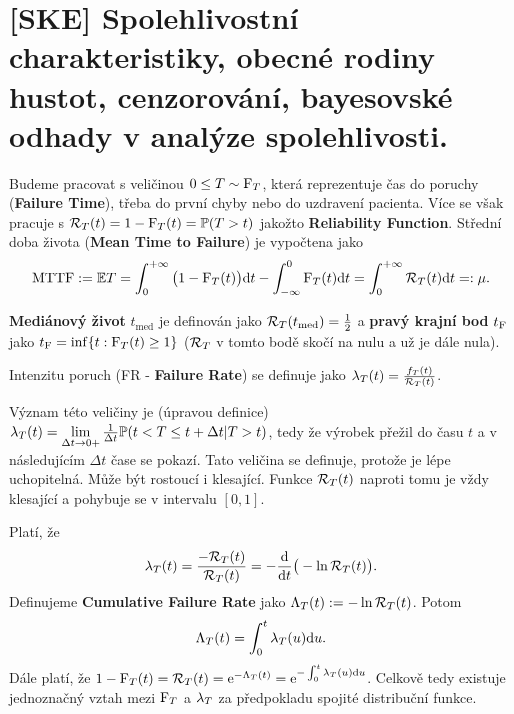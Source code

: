 \chapter{[SKE] Spolehlivostní charakteristiky, obecné rodiny hustot, cenzorování, bayesovské odhady v analýze spolehlivosti.}

Budeme pracovat s veličinou  $0\leq T\sim \mathrm{F}_T$, která reprezentuje čas do poruchy (\textbf{Failure Time}), třeba do první chyby nebo do uzdravení pacienta. Více se však pracuje s $\mathcal{R}_T(t)=1-\mathrm{F}_T(t)=\mathbb{P}(T>t)$ jakožto \textbf{Reliability Function}. Střední doba života (\textbf{Mean Time to Failure}) je vypočtena jako $$\mathrm{MTTF}:=\mathbb{E} T=\int_{0}^{+\infty}\big(1-\mathrm{F}_T(t)\big)\mathrm{d} t - \int_{-\infty}^0\mathrm{F}_T(t)\mathrm{d} t = \int_{0}^{+\infty}\mathcal{R}_T(t)\mathrm{d} t=:\mu.$$

\begin{define}
	\textbf{Mediánový život} $t_\mathrm{med}$ je definován jako $\mathcal{R}_T(t_\mathrm{med})=\frac{1}{2}$ a  \textbf{pravý krajní bod} $t_{\mathrm{F}}$ jako  $t_{\mathrm{F}}=\inf\{ t:\mathrm{F}_T(t)\geq1 \}$ ($\mathcal{R}_T$ v tomto bodě skočí na nulu a už je dále nula).
\end{define}

\begin{define}
	Intenzitu poruch (FR - \textbf{Failure Rate}) se definuje jako  $\lambda_T(t)=\frac{f_T(t)}{\mathcal{R}_T(t)}$.
\end{define}

Význam této veličiny je (úpravou definice) $\lambda_T(t)=\lim\limits_{\Delta t\to 0+}\frac{1}{\Delta t}\mathbb{P}(t<T\leq t+\Delta t|T>t)$, tedy že výrobek přežil do času $t$ a v následujícím $\Delta t$ čase se pokazí. Tato veličina se definuje, protože je lépe uchopitelná. Může být rostoucí i klesající. Funkce $\mathcal{R}_T(t)$ naproti tomu je vždy klesající a pohybuje se v intervalu $[0,1]$.

\begin{theorem}[Vztahy] Platí, že
	$$ \lambda_T(t)=\frac{-\mathcal{R}_T(t)}{\mathcal{R}_T(t)}=-\frac{\mathrm{d}}{\mathrm{d} t}\big(-\ln \mathcal{R}_T(t)\big). $$
	Definujeme \textbf{Cumulative Failure Rate} jako $\Lambda_T(t):= -\ln\mathcal{R}_T(t)$. Potom
	$$ \Lambda_T(t) = \int_{0}^{t}\lambda_T(u)\mathrm{d} u. $$
	Dále platí, že 
	$ 1-\mathrm{F}_T(t)=\mathcal{R}_T(t)=\mathrm{e}^{-\Lambda_T(t)} = \mathrm{e}^{-\int_{0}^{t}\lambda_T(u)\mathrm{d} u}$. Celkově tedy existuje jednoznačný vztah mezi $\mathrm{F}_T$ a $\lambda_T$ za předpokladu spojité distribuční funkce.
\end{theorem}

